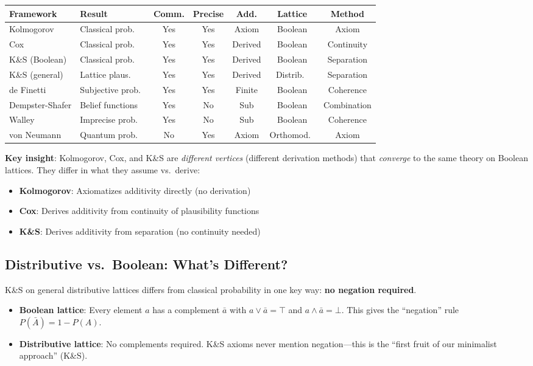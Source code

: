 \documentclass[11pt]{article}
\theoremstyle{definition}
\theoremstyle{remark}
\begin{document}
\begin{center}
\begin{tabular}{llccccc}
\textbf{Framework} & \textbf{Result} & \textbf{Comm.} & \textbf{Precise} & \textbf{Add.} & \textbf{Lattice} & \textbf{Method} \\
\hline
Kolmogorov & Classical prob.\ & Yes & Yes & Axiom & Boolean & Axiom \\
Cox & Classical prob.\ & Yes & Yes & Derived & Boolean & Continuity \\
K\&S (Boolean) & Classical prob.\ & Yes & Yes & Derived & Boolean & Separation \\
\hline
K\&S (general) & Lattice plaus.\ & Yes & Yes & Derived & Distrib.\ & Separation \\
\hline
de Finetti & Subjective prob.\ & Yes & Yes & Finite & Boolean & Coherence \\
Dempster-Shafer & Belief functions & Yes & No & Sub & Boolean & Combination \\
Walley & Imprecise prob.\ & Yes & No & Sub & Boolean & Coherence \\
\hline
von Neumann & Quantum prob.\ & No & Yes & Axiom & Orthomod.\ & Axiom \\
\end{tabular}
\end{center}

\textbf{Key insight}: Kolmogorov, Cox, and K\&S are \emph{different vertices} (different derivation methods) that \emph{converge} to the same theory on Boolean lattices.
They differ in what they assume vs.\ derive:
\begin{itemize}
\item \textbf{Kolmogorov}: Axiomatizes additivity directly (no derivation)
\item \textbf{Cox}: Derives additivity from continuity of plausibility functions
\item \textbf{K\&S}: Derives additivity from separation (no continuity needed)
\end{itemize}

\subsection{Distributive vs.\ Boolean: What's Different?}

K\&S on general distributive lattices differs from classical probability in one key way: \textbf{no negation required}.

\begin{itemize}
\item \textbf{Boolean lattice}: Every element $a$ has a complement $\bar{a}$ with $a \vee \bar{a} = \top$ and $a \wedge \bar{a} = \bot$.
  This gives the ``negation'' rule $P(\bar{A}) = 1 - P(A)$.

\item \textbf{Distributive lattice}: No complements required.
  K\&S axioms never mention negation---this is the ``first fruit of our minimalist approach'' (K\&S).
\end{itemize}
\end{document}
